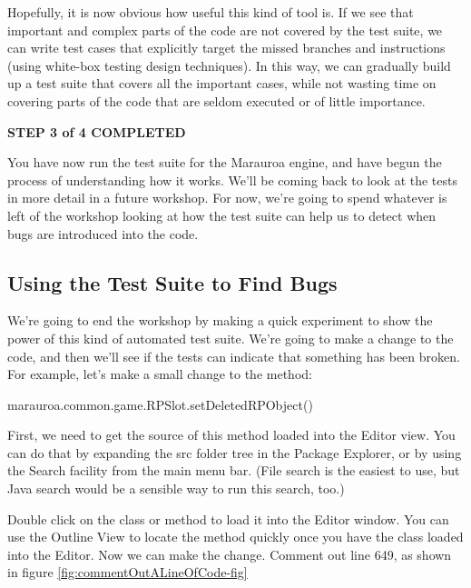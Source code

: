 \documentclass[
]{book}
\newenvironment{Shaded}{\begin{snugshade}}{\end{snugshade}}
\newcommand{\FunctionTok}[1]{\textcolor[rgb]{0.00,0.00,0.00}{#1}}
\newcommand{\NormalTok}[1]{#1}
\begin{document}
Hopefully, it is now obvious how useful this kind of tool is. If we see that important and complex parts of the code are not covered by the test suite, we can write test cases that explicitly target the missed branches and instructions (using white-box testing design techniques). In this way, we can gradually build up a test suite that covers all the important cases, while not wasting time on covering parts of the code that are seldom executed or of little importance.

\textbf{STEP 3 of 4 COMPLETED}

You have now run the test suite for the Marauroa engine, and have begun the process of understanding how it works. We'll be coming back to look at the tests in more detail in a future workshop. For now, we're going to spend whatever is left of the workshop looking at how the test suite can help us to detect when bugs are introduced into the code.

\hypertarget{using-the-test-suite-to-find-bugs}{%
\subsection{Using the Test Suite to Find Bugs}\label{using-the-test-suite-to-find-bugs}}

We're going to end the workshop by making a quick experiment to show the power of this kind of automated test suite. We're going to make a change to the code, and then we'll see if the tests can indicate that something has been broken. For example, let's make a small change to the method:

\begin{Shaded}
\begin{Highlighting}[]
\NormalTok{marauroa.}\FunctionTok{common}\NormalTok{.}\FunctionTok{game}\NormalTok{.}\FunctionTok{RPSlot}\NormalTok{.}\FunctionTok{setDeletedRPObject}\NormalTok{()}
\end{Highlighting}
\end{Shaded}

First, we need to get the source of this method loaded into the Editor view. You can do that by expanding the src folder tree in the Package Explorer, or by using the Search facility from the main menu bar. (File search is the easiest to use, but Java search would be a sensible way to run this search, too.)

Double click on the class or method to load it into the Editor window. You can use the Outline View to locate the method quickly once you have the class loaded into the Editor. Now we can make the change. Comment out line 649, as shown in figure \ref{fig:commentOutALineOfCode-fig}
\end{document}
